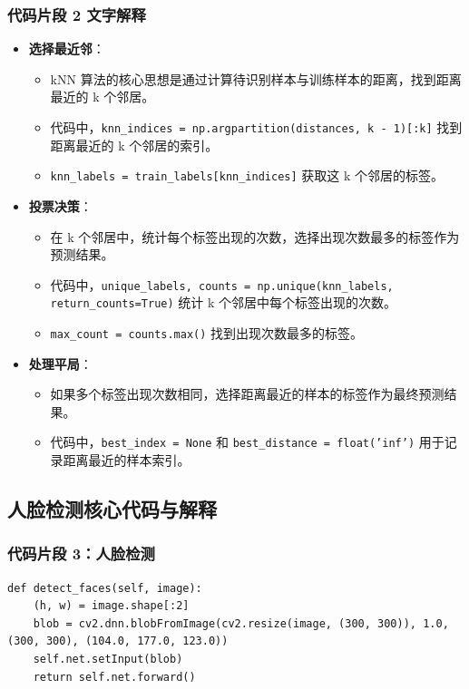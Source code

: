 \documentclass{article}
\begin{document}
\subsubsection{代码片段 2 文字解释}
\begin{itemize}
    \item \textbf{选择最近邻}：
    \begin{itemize}
        \item kNN 算法的核心思想是通过计算待识别样本与训练样本的距离，找到距离最近的 k 个邻居。
        \item 代码中，\texttt{knn\_indices = np.argpartition(distances, k - 1)[:k]} 找到距离最近的 k 个邻居的索引。
        \item \texttt{knn\_labels = train\_labels[knn\_indices]} 获取这 k 个邻居的标签。
    \end{itemize}
    \item \textbf{投票决策}：
    \begin{itemize}
        \item 在 k 个邻居中，统计每个标签出现的次数，选择出现次数最多的标签作为预测结果。
        \item 代码中，\texttt{unique\_labels, counts = np.unique(knn\_labels, return\_counts=True)} 统计 k 个邻居中每个标签出现的次数。
        \item \texttt{max\_count = counts.max()} 找到出现次数最多的标签。
    \end{itemize}
    \item \textbf{处理平局}：
    \begin{itemize}
        \item 如果多个标签出现次数相同，选择距离最近的样本的标签作为最终预测结果。
        \item 代码中，\texttt{best\_index = None} 和 \texttt{best\_distance = float('inf')} 用于记录距离最近的样本索引。
    \end{itemize}
\end{itemize}

\subsection{人脸检测核心代码与解释}

\subsubsection{代码片段 3：人脸检测}
\begin{lstlisting}[basicstyle=\scriptsize\ttfamily, linewidth=\textwidth]
def detect_faces(self, image):
    (h, w) = image.shape[:2]
    blob = cv2.dnn.blobFromImage(cv2.resize(image, (300, 300)), 1.0, (300, 300), (104.0, 177.0, 123.0))
    self.net.setInput(blob)
    return self.net.forward()
\end{lstlisting}
\end{document}
